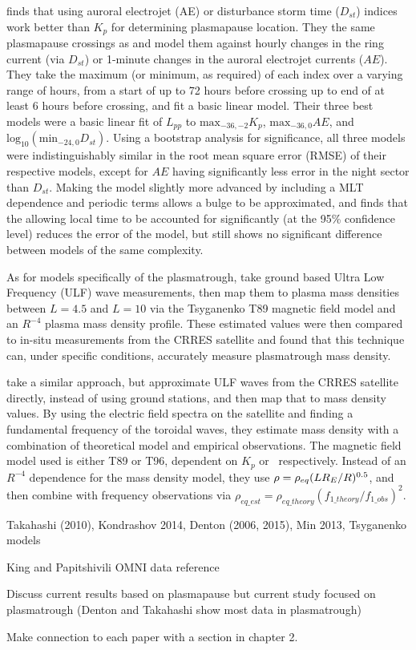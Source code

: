 \cite{OBrien2003EmpiricalPlasmapause} finds that using auroral electrojet (AE) or disturbance storm time ($D_{st}$) indices work better than $K_p$ for determining plasmapause location. They the same plasmapause crossings as \citep{Moldwin2002ModelPlasmapause} and model them against hourly changes in the ring current (via $D_{st}$) or 1-minute changes in the auroral electrojet currents ($AE$). They take the maximum (or minimum, as required) of each index over a varying range of hours, from a start of up to 72 hours before crossing up to end of at least 6 hours before crossing, and fit a basic linear model. Their three best models were a basic linear fit of $L_{pp}$ to $\text{max}_{-36,-2}K_p$, $\text{max}_{-36,0}AE$, and $\text{log}_{10}(\text{min}_{-24,0}D_{st})$. Using a bootstrap analysis for significance, all three models were indistinguishably similar in the root mean square error (RMSE) of their respective models, except for $AE$ having significantly less error in the night sector than $D_{st}$. Making the model slightly more advanced by including a MLT dependence and periodic terms allows a bulge to be approximated, and finds that the allowing local time to be accounted for significantly (at the 95\% confidence level) reduces the error of the model, but still shows no significant difference between models of the same complexity.

As for models specifically of the plasmatrough, \cite{Lotoaniu1999PlasmaMassDensity} take ground based Ultra Low Frequency (ULF) wave measurements, then map them to plasma mass densities between $L=4.5$ and $L=10$ via the Tsyganenko T89 magnetic field model and an $R^{-4}$ plasma mass density profile. These estimated values were then compared to in-situ measurements from the CRRES satellite and found that this technique can, under specific conditions, accurately measure plasmatrough mass density. 

\cite{Takahashi2006MassDensityInferred} take a similar approach, but approximate ULF waves from the CRRES satellite directly, instead of using ground stations, and then map that to mass density values. By using the electric field spectra on the satellite and finding a fundamental frequency of the toroidal waves, they estimate mass density with a combination of theoretical model and empirical observations. The magnetic field model used is either T89 or T96, dependent on $K_p$ or \dst\  respectively. Instead of an $R^{-4}$ dependence for the mass density model, they use $\rho=\rho_{eq}(LR_E/R)^{0.5}$, and then combine with frequency observations via $\rho_{eq\_est}=\rho_{eq\_theory}(f_{1\_theory}/f_{1\_obs})^2$.

\vnote Takahashi (2010), Kondrashov 2014, Denton (2006, 2015), Min 2013, Tsyganenko models

\vnote King and Papitshivili OMNI data reference

\vnote Discuss current results based on plasmapause but current study focused on plasmatrough (Denton and Takahashi show most data in plasmatrough)

\note Make connection to each paper with a section in chapter 2.


